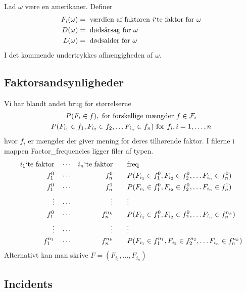 \documentclass[a4paper, 12pt]{memoir}
\begin{document}
Lad $\omega$ være en amerikaner. Definer
\begin{align*}
F_i(\omega)&= \textup{ værdien af faktoren } i \textup{`te faktor for } \omega\\
D(\omega)&= \textup{ dødsårsag for } \omega\\
L(\omega)&= \textup{  dødsalder for } \omega
\end{align*}
I det kommende undertrykkes afhængigheden af $\omega$. 
\subsection{Faktorsandsynligheder}

Vi har blandt andet brug for størrelserne
\begin{gather*}
P(F_i\in f), \textup{ for forskellige mængder } f\in \mathcal F_i\\
P(F_{i_1}\in f_1, F_{i_2}\in f_2, \dots F_{i_n}\in f_n) \textup{ for } f_i, i=1, \dots, n
\end{gather*}
hvor $f_i$ er mængder der giver mening for deres tilhørende faktor. I filerne i mappen Factor\_frequencies ligger filer af typen.
\begin{align*}
 i_1 \textup{`te faktor} \quad& \cdots&  i_n\textup{`te faktor} \qquad& 	\textup{freq}\\
f_1^0 \quad & \cdots& f_n^0 \qquad&  P(F_{i_1}\in f_1^0, F_{i_2}\in f_2^0, \dots F_{i_n}\in f_n^0)\\
f_1^0 \quad & \cdots& f_n^1 \qquad&  P(F_{i_1}\in f_1^0, F_{i_2}\in f_2^0, \dots F_{i_n}\in f_n^1)\\
\vdots\quad &\cdots &\vdots \qquad &\vdots\\
f_1^0 \quad & \cdots& f_n^{n_k} \qquad&  P(F_{i_1}\in f_1^0, F_{i_2}\in f_2^0, \dots F_{i_n}\in f_n^{n_k})\\
\vdots\quad &\cdots &\vdots \qquad &\vdots\\
f_1^{n_1} \quad & \cdots& f_n^{n_k} \qquad& P(F_{i_1}\in f_1^{n_1}, F_{i_2}\in f_2^{n_2}, \dots F_{i_n}\in f_n^{n_k})
\end{align*}
Alternativt kan man skrive $F=(F_{i_1}, \dots , F_{i_n})$
\subsection{Incidents}
\end{document}
